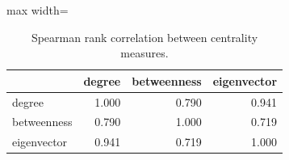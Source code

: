 \begin{table}
\centering
\caption{Spearman rank correlation between centrality measures.}
\label{tab:centrality_corr}
\begin{adjustbox}{max width=\textwidth}
\begin{tabular}{lrrr}
\toprule
 & degree & betweenness & eigenvector \\
\midrule
degree & 1.000 & 0.790 & 0.941 \\
betweenness & 0.790 & 1.000 & 0.719 \\
eigenvector & 0.941 & 0.719 & 1.000 \\
\bottomrule
\end{tabular}
\end{adjustbox}
\end{table}
